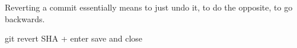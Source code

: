 Reverting a commit essentially means to just undo it, 
to do the opposite, to go backwards.

git revert SHA   + enter 
save and close 